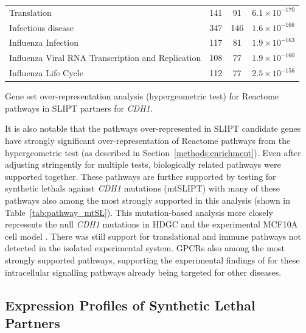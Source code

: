 \begin{table}[!ht]
{\begin{threeparttable}
\begin{tabular}{lccc}
  \rowcolor{black!5}
  Translation & 141 &  91 & $6.1 \times 10^{-170}$ \\ 
  \rowcolor{black!10}
  Infectious disease & 347 & 146 & $1.6 \times 10^{-166}$ \\ 
  \rowcolor{black!5}
  Influenza Infection & 117 &  81 & $1.9 \times 10^{-163}$ \\ 
  \rowcolor{black!10}
  Influenza Viral \acrshort{RNA} Transcription and Replication & 108 &  77 & $1.9 \times 10^{-160}$ \\ 
  \rowcolor{black!5}
  Influenza Life Cycle & 112 &  77 & $2.5 \times 10^{-156}$ \\ 
   \hline
\end{tabular}
\begin{tablenotes}
\raggedright \small
Gene set over-representation analysis (hypergeometric test) for Reactome pathways in \gls{SLIPT} partners for \textit{CDH1}.
\end{tablenotes}
\end{threeparttable}
}
\end{table}

It is also notable that the pathways over-represented in \gls{SLIPT} candidate genes have strongly significant over-representation of Reactome pathways from the hypergeometric test (as described in Section~\ref{methods:enrichment}). Even after adjusting stringently for multiple tests, biologically related pathways were supported together. These pathways are further supported by testing for \glspl{synthetic lethal} against \textit{CDH1} \glspl{mutation} (\acrshort{mtSLIPT}) with many of these pathways also among the most strongly supported in this analysis (shown in Table~\ref{tab:pathway_mtSL}). This \gls{mutation}-based analysis more closely represents the null \textit{CDH1} \glspl{mutation} in \gls{HDGC} \citep{Guilford1998} and the experimental \gls{MCF10A} cell model \citep{Chen2014}. There was still support for translational and immune pathways not detected in the isolated experimental system.  \glspl{GPCR} also among the most strongly supported pathways, supporting the experimental findings of \citet{Telford2015} for these intracellular signalling pathways already being targeted for other diseases. 


\FloatBarrier


\subsection{Expression Profiles of Synthetic Lethal Partners} \label{chapt3:exprSL_clusters}

